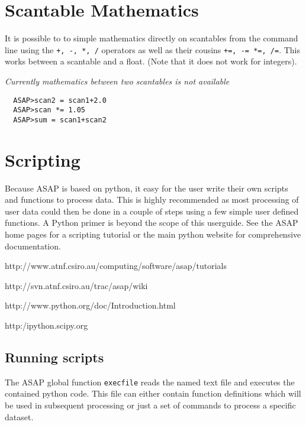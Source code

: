 \documentclass[11pt]{article}
\newcommand{\cmd}[1]{{\tt #1}}
\begin{document}
\section{Scantable Mathematics}

It is possible to to simple mathematics
directly on scantables from the command line using the \cmd{+, -, *,
/} operators as well as their cousins \cmd{+=, -= *=, /=}. This works
between a scantable and a float. (Note that it does
not work for integers).

{\em Currently mathematics between two scantables is not available }

\begin{verbatim}
  ASAP>scan2 = scan1+2.0
  ASAP>scan *= 1.05
  ASAP>sum = scan1+scan2
\end{verbatim}

\section{Scripting}

Because ASAP is based on python, it easy for the user
write their own scripts and functions to process data. This is highly
recommended as most processing of user data could then be done in a
couple of steps using a few simple user defined functions. A Python
primer is beyond the scope of this userguide. See the ASAP home pages
for a scripting tutorial or the main python website for comprehensive
documentation.

\hspace{1cm} http://www.atnf.csiro.au/computing/software/asap/tutorials

\hspace{1cm} http://svn.atnf.csiro.au/trac/asap/wiki

\hspace{1cm} http://www.python.org/doc/Introduction.html

\hspace{1cm} http:/ipython.scipy.org

\subsection{Running scripts}

The ASAP global function \cmd{execfile} reads the named text file and
executes the contained python code. This file can either contain
function definitions which will be used in subsequent processing or
just a set of commands to process a specific dataset.
\end{document}
